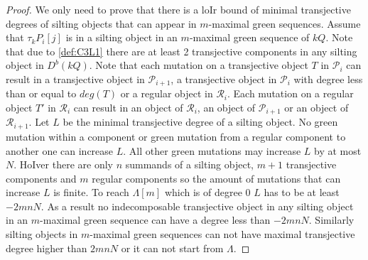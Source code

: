 \begin{proof}
\indent We only need to prove that there is a loIr bound of minimal transjective degrees of silting objects that can appear in $m$-maximal green sequences. Assume that $\tau_kP_i[j]$ is in a silting object in an $m$-maximal green sequence of $kQ$. Note that due to \ref{def:C3L1} there are at least 2 transjective components in any silting object in $D^b(kQ)$. Note that each mutation on a transjective object $T$ in $\mathcal{P}_i$ can result in a transjective object in $\mathcal{P}_{i+1}$, a transjective object in $\mathcal{P}_i$ with degree less than or equal to $deg(T)$ or a regular object in $\mathcal{R}_i$. Each mutation on a regular object $T'$ in $\mathcal{R}_i$ can result in an object of $\mathcal{R}_i$, an object of $\mathcal{P}_{i+1}$ or an object of $\mathcal{R}_{i+1}$. Let $L$ be the minimal transjective degree of a silting object. No green mutation within a component or green mutation from a regular component to another one can increase $L$. All other green mutations may increase $L$ by at most $N$. HoIver there are only $n$ summands of a silting object, $m+1$ transjective components and $m$ regular components so the amount of mutations that can increase $L$ is finite. To reach $\Lambda[m]$ which is of degree 0 $L$ has to be at least $-2mnN$. As a result no indecomposable transjective object in any silting object in an $m$-maximal green sequence can have a degree less than $-2mnN$. Similarly silting objects in $m$-maximal green sequences can not have maximal transjective degree higher than $2mnN$ or it can not start from $\Lambda$.
\end{proof}
